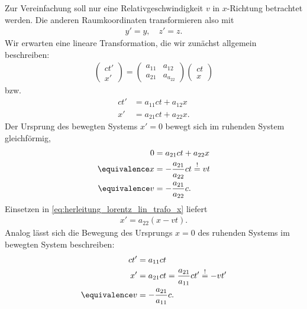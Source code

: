 Zur Vereinfachung soll nur eine Relativgeschwindigkeit $v$ in $x$-Richtung betrachtet werden.
Die anderen Raumkoordinaten transformieren also mit
\begin{align*}
    y'=y, \quad z'=z.
\end{align*}
Wir erwarten eine lineare Transformation, die wir zunächst allgemein beschreiben:
\begin{align}
    \label{eq:herleitung_lorentz_lin_trafo}
    \begin{pmatrix} ct' \\ x' \end{pmatrix} = \begin{pmatrix} a_{11} & a_{12} \\ a_{21} & a_{a_22} \end{pmatrix} \begin{pmatrix} ct \\ x \end{pmatrix}
\end{align}
bzw.
\begin{align}
    \label{eq:herleitung_lorentz_lin_trafo_ct}
    ct' & = a_{11} ct + a_{12}x \\
    \label{eq:herleitung_lorentz_lin_trafo_x}
    x'  & = a_{21} ct + a_{22}x.
\end{align}
Der Ursprung des bewegten Systems $x'=0$ bewegt sich im ruhenden System gleichförmig,
\begin{align}
    0              & = a_{21} ct + a_{22}x \nonumber                       \\
    \equivalence x & = -\frac{a_{21}}{a_{22}}ct \overset{!}{=}vt \nonumber \\
    \label{eq:herleitung_lorentz_v1}
    \equivalence v & = -\frac{a_{21}}{a_{22}} c.
\end{align}
Einsetzen in \eqref{eq:herleitung_lorentz_lin_trafo_x} liefert
\begin{align}
    \label{eq:herleitung_lorentz_xprime}
    x'=a_{22} (x-vt).
\end{align}
Analog lässt sich die Bewegung des Ursprungs $x=0$ des ruhenden Systems im bewegten System beschreiben:
\begin{align}
    ct'            & = a_{11}ct \nonumber                                                \\
    x'             & = a_{21}ct = \frac{a_{21}}{a_{11}}ct' \overset{!}{=} -vt' \nonumber \\
    \label{eq:herleitung_lorentz_v2}
    \equivalence v & =-\frac{a_{21}}{a_{11}}c.
\end{align}
